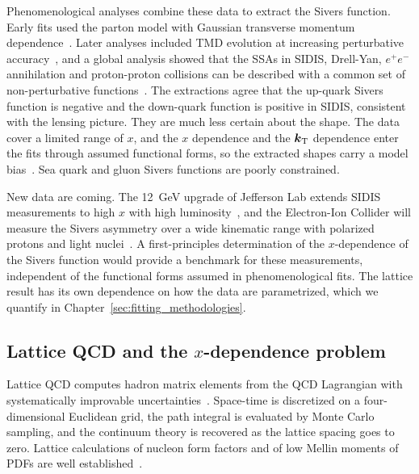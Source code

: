 Phenomenological analyses combine these data to extract the Sivers function. Early fits used the parton model with Gaussian transverse momentum dependence~\cite{Anselmino:2005ea,Anselmino:2008sga}. Later analyses included TMD evolution at increasing perturbative accuracy~\cite{Echevarria:2014xaa,Bacchetta:2020gko,Bury:2020vhj,Bury:2021sue}, and a global analysis showed that the SSAs in SIDIS, Drell-Yan, $e^+e^-$ annihilation and proton-proton collisions can be described with a common set of non-perturbative functions~\cite{Cammarota:2020qcw}. The extractions agree that the up-quark Sivers function is negative and the down-quark function is positive in SIDIS, consistent with the lensing picture. They are much less certain about the shape. The data cover a limited range of $x$, and the $x$ dependence and the $\boldsymbol{k}_{\mathrm T}$ dependence enter the fits through assumed functional forms, so the extracted shapes carry a model bias~\cite{Boussarie:2023izj}. Sea quark and gluon Sivers functions are poorly constrained.

New data are coming. The 12~GeV upgrade of Jefferson Lab extends SIDIS measurements to high $x$ with high luminosity~\cite{Dudek:2012vr}, and the Electron-Ion Collider will measure the Sivers asymmetry over a wide kinematic range with polarized protons and light nuclei~\cite{Accardi:2012qut,AbdulKhalek:2021gbh}. A first-principles determination of the $ x$-dependence of the Sivers function would provide a benchmark for these measurements, independent of the functional forms assumed in phenomenological fits. The lattice result has its own dependence on how the data are parametrized, which we quantify in Chapter~\ref{sec:fitting_methodologies}.

\subsection{Lattice QCD and the \texorpdfstring{$x$}{x}-dependence problem}
\label{sec:intro_lattice}

Lattice QCD computes hadron matrix elements from the QCD Lagrangian with systematically improvable uncertainties~\cite{Wilson:1974sk,Gattringer:2010zz,Lin:2014}. Space-time is discretized on a four-dimensional Euclidean grid, the path integral is evaluated by Monte Carlo sampling, and the continuum theory is recovered as the lattice spacing goes to zero. Lattice calculations of nucleon form factors and of low Mellin moments of PDFs are well established~\cite{Gockeler:1996mu,Lin:2017snn,Constantinou:2020hdm}.

